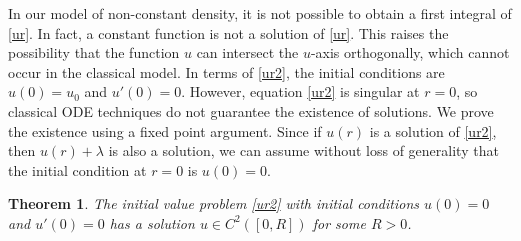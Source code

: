 \documentclass[preprint,11pt]{elsarticle}
\newtheorem{theorem}{Theorem}[section]
\theoremstyle{definition}
\begin{document}
In our model of non-constant density, it is not possible to obtain a first integral of \eqref{ur}.  In fact,  a constant function is not a solution of \eqref{ur}. This raises the possibility that the function $u$ can intersect the $u$-axis orthogonally, which cannot occur in the classical model. In terms of \eqref{ur2}, the initial conditions  are $u(0)=u_0$ and $u'(0)=0$. However, equation \eqref{ur2} is singular at $r=0$, so classical ODE techniques do not guarantee the existence of solutions. We prove the existence using a fixed point argument. Since if $u(r)$ is a solution of \eqref{ur2}, then $u(r)+\lambda$ is also a solution, we can assume without loss of generality that the initial condition at $r=0$ is  $u(0)=0$.

 
\begin{theorem}\label{t1}
The initial value problem \eqref{ur2} with initial conditions $u(0)=0$ and $u'(0)=0$ has a solution $u\in C^2([0,R])$ for some $R>0$. 
\end{theorem}
 
\end{document}
